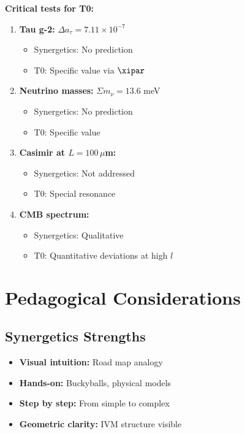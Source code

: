 	\begin{vorteil}
		\textbf{Critical tests for T0:}
		
		\begin{enumerate}
			\item \textbf{Tau g-2:} $\Delta a_\tau = 7.11 \times 10^{-7}$
			\begin{itemize}
				\item Synergetics: No prediction
				\item T0: Specific value via $\xipar$
			\end{itemize}
			
			\item \textbf{Neutrino masses:} $\Sigma m_\nu = 13.6$ meV
			\begin{itemize}
				\item Synergetics: No prediction
				\item T0: Specific value
			\end{itemize}
			
			\item \textbf{Casimir at $L = 100\,\mu$m:}
			\begin{itemize}
				\item Synergetics: Not addressed
				\item T0: Special resonance
			\end{itemize}
			
			\item \textbf{CMB spectrum:}
			\begin{itemize}
				\item Synergetics: Qualitative
				\item T0: Quantitative deviations at high $l$
			\end{itemize}
		\end{enumerate}
	\end{vorteil}
	
	\section{Pedagogical Considerations}
	
	\subsection{Synergetics Strengths}
	
	\begin{itemize}
		\item \textbf{Visual intuition:} Road map analogy
		\item \textbf{Hands-on:} Buckyballs, physical models
		\item \textbf{Step by step:} From simple to complex
		\item \textbf{Geometric clarity:} IVM structure visible
	\end{itemize}
	
